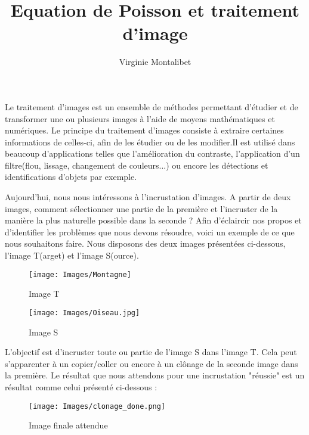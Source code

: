 \documentclass[10pt,a4paper]{article}
\author{Virginie Montalibet}
\title{Equation de Poisson et traitement d'image}
\begin{document}
\newpage

Le traitement d'images est un ensemble de méthodes permettant d'étudier et de transformer une ou plusieurs images à l'aide de moyens mathématiques et numériques. Le principe du traitement d'images consiste à extraire certaines informations de celles-ci, afin de les étudier ou de les modifier.Il est utilisé dans beaucoup d'applications telles que l'amélioration du contraste, l'application d'un filtre(flou, lissage, changement de couleurs...) ou encore les détections et identifications d'objets par exemple. 

Aujourd'hui, nous nous intéressons à l'incrustation d'images. A partir de deux images, comment sélectionner une partie de la première et l'incruster de la manière la plus naturelle possible dans la seconde ? 
\newline
Afin d'éclaircir nos propos et d'identifier les problèmes que nous devons résoudre, voici un exemple de ce que nous souhaitons faire. Nous disposons des deux images présentées ci-dessous, l'image T(arget) et l'image S(ource). 
\newline
\begin{figure}[!htb]
   \begin{minipage}{0.48\textwidth}
     \centering
     \texttt{[image: Images/Montagne]}
     \caption{Image T}
      \end{minipage}\hfill
   \begin{minipage}{0.48\textwidth}
     \centering
     \texttt{[image: Images/Oiseau.jpg]}
     \caption{Image S}\label{Fig:Data2}
   \end{minipage}
\end{figure}

L'objectif est d'incruster toute ou partie de l'image S dans l'image T. Cela peut s'apparenter à un copier/coller ou encore à un clônage de la seconde image dans la première.
Le résultat que nous attendons pour une incrustation "réussie" est un résultat comme celui présenté ci-dessous : 
    
\begin{center}
\begin{figure}[!htb]
   \centering
     \texttt{[image: Images/clonage\_done.png]}
     \caption{Image  finale attendue}
\end{figure}
\end{center}
\end{document}
